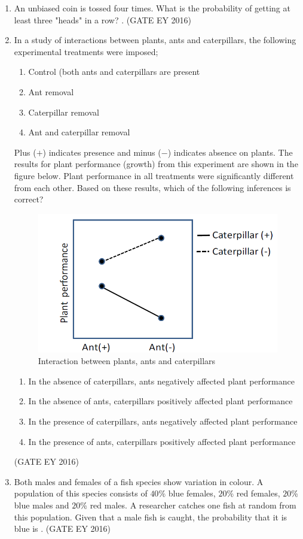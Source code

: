 \documentclass[journal]{IEEEtran}
\begin{document}
\begin{enumerate}
\item An unbiased coin is tossed four times. What is the probability of getting at least three "heads" in a row? \underline{\hspace{3cm}}.
\hfill{(GATE EY 2016)}
\bigskip 
\item In a study of interactions between plants, ants and caterpillars, the following experimental treatments were imposed;
\begin{enumerate}[label=(\roman*)]
        \item Control (both ants and caterpillars are present
        \item Ant removal
        \item Caterpillar removal
        \item Ant and caterpillar removal
    \end{enumerate}
Plus ($+$) indicates presence and minus ($-$) indicates absence on plants. The results for plant performance (growth) from this experiment are shown in the figure below. Plant performance in all treatments were significantly different from each other. Based on these results, which of the following inferences is correct? 
\begin{figure}[!ht]
    \centering
    \includegraphics[width=0.5\columnwidth]{figs/Q-48.png}
    \caption{Interaction between plants, ants and caterpillars}
    \label{Fig.6}
\end{figure}
\begin{enumerate}
    \item In the absence of caterpillars, ants negatively affected plant performance
    \item In the absence of ants, caterpillars positively affected plant performance
    \item In the presence of caterpillars, ants negatively affected plant performance
    \item In the presence of ants, caterpillars positively affected plant performance
\end{enumerate}
\hfill{(GATE EY 2016)}

\item Both males and females of a fish species show variation in colour. A population of this species consists of $40$\% blue females, $20$\% red females, $20$\% blue males and $20$\% red males. A researcher catches one fish at random from this population. Given that a male fish is caught, the probability that it is blue is \underline{\hspace{3cm}}.
\hfill{(GATE EY 2016)}


\end{enumerate}
\end{document}

